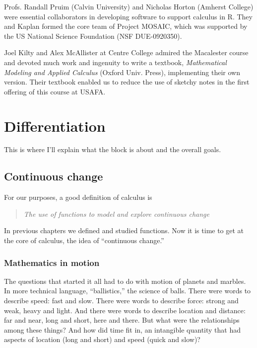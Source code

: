 \documentclass[
  letterpaper,
  DIV=11,
  numbers=noendperiod,
  oneside]{scrreprt}
\begin{document}
Profs. Randall Pruim (Calvin University) and Nicholas Horton (Amherst
College) were essential collaborators in developing software to support
calculus in R. They and Kaplan formed the core team of Project MOSAIC,
which was supported by the US National Science Foundation (NSF
DUE-0920350).

Joel Kilty and Alex McAllister at Centre College admired the Macalester
course and devoted much work and ingenuity to write a textbook,
\emph{Mathematical Modeling and Applied Calculus} (Oxford Univ. Press),
implementing their own version. Their textbook enabled us to reduce the
use of sketchy notes in the first offering of this course at USAFA.

\part{Differentiation}

This is where I'll explain what the block is about and the overall
goals.

\hypertarget{sec-continuous-change}{%
\chapter{Continuous change}\label{sec-continuous-change}}

For our purposes, a good definition of calculus is

\begin{quote}
\emph{The use of functions to model and explore continuous change}
\end{quote}

In previous chapters we defined and studied functions. Now it is time to
get at the core of calculus, the idea of ``continuous change.''

\hypertarget{mathematics-in-motion}{%
\section{Mathematics in motion}\label{mathematics-in-motion}}

The questions that started it all had to do with motion of planets and
marbles. In more technical language, ``ballistics,'' the science of
balls. There were words to describe speed: fast and slow. There were
words to describe force: strong and weak, heavy and light. And there
were words to describe location and distance: far and near, long and
short, here and there. But what were the relationships among these
things? And how did time fit in, an intangible quantity that had aspects
of location (long and short) and speed (quick and slow)?
\end{document}
